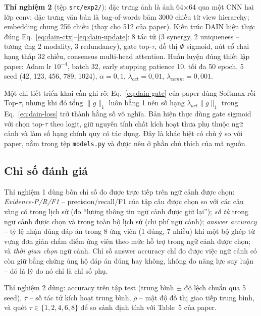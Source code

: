 \textbf{Thí nghiệm 2} (tệp \texttt{src/exp2/}): đặc trưng ảnh là ảnh 64$\times$64 qua một CNN hai lớp conv; đặc trưng văn bản là bag-of-words băm 3000 chiều từ view hierarchy; embedding chung 256 chiều (thay cho 512 của paper). Kiến trúc DAIN hiện thực đúng Eq.~\ref{eq:dain-ctx}--\ref{eq:dain-update}: 8 tác tử (3 synergy, 2 uniqueness -- tương ứng 2 modality, 3 redundancy), gate top-$\tau$, đồ thị $\Phi$ sigmoid, nút cổ chai hạng thấp 32 chiều, consensus multi-head attention. Huấn luyện đúng thiết lập paper: Adam lr $10^{-4}$, batch 32, early stopping patience 10, tối đa 50 epoch, 5 seed (42, 123, 456, 789, 1024), $\alpha=0{,}1$, $\lambda_{act}=0{,}01$, $\lambda_{comm}=0{,}001$.

Một chi tiết triển khai cần ghi rõ: Eq.~\ref{eq:dain-gate} của paper dùng Softmax rồi Top-$\tau$, nhưng khi đó tổng $\|g\|_1$ luôn bằng 1 nên số hạng $\lambda_{act}\|g\|_1$ trong Eq.~\ref{eq:dain-loss} trở thành hằng số vô nghĩa. Bản hiện thực dùng gate sigmoid với chọn top-$\tau$ theo logit, giữ nguyên tính chất kích hoạt thưa phụ thuộc ngữ cảnh và làm số hạng chính quy có tác dụng. Đây là khác biệt có chủ ý so với paper, nằm trong tệp \texttt{models.py} và được nêu ở phần chú thích của mã nguồn.

\subsection{Chỉ số đánh giá}
Thí nghiệm 1 dùng bốn chỉ số đo được trực tiếp trên ngữ cảnh được chọn: \emph{Evidence-P/R/F1} -- precision/recall/F1 của tập câu được chọn so với các câu vàng có trong lịch sử (đo ``lượng thông tin ngữ cảnh được giữ lại''); \emph{số từ} trong ngữ cảnh được chọn và trong toàn bộ lịch sử (chi phí ngữ cảnh); \emph{answer accuracy} -- tỷ lệ nhận đúng đáp án trong 8 ứng viên (1 đúng, 7 nhiễu) khi một bộ ghép từ vựng đơn giản chấm điểm ứng viên theo mức hỗ trợ trong ngữ cảnh được chọn; và \emph{thời gian chọn} ngữ cảnh. Chỉ số answer accuracy chỉ đo được việc ngữ cảnh có còn giữ bằng chứng ủng hộ đáp án đúng hay không, không đo năng lực suy luận -- đó là lý do nó chỉ là chỉ số phụ.

Thí nghiệm 2 dùng: accuracy trên tập test (trung bình $\pm$ độ lệch chuẩn qua 5 seed), $\bar{\tau}$ -- số tác tử kích hoạt trung bình, $\bar{\rho}$ -- mật độ đồ thị giao tiếp trung bình, và quét $\tau \in \{1,2,4,6,8\}$ để so sánh định tính với Table~5 của paper.
